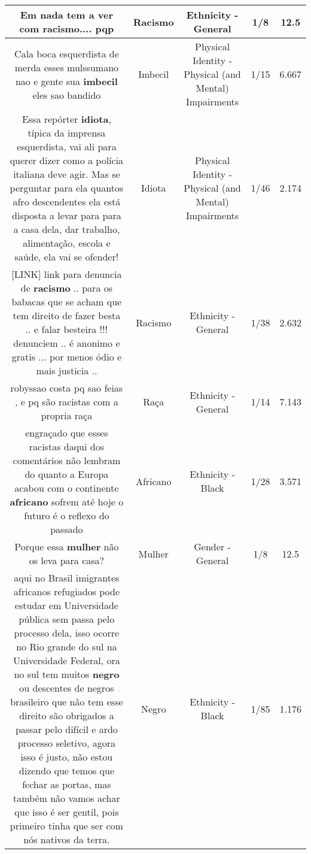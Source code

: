 \documentclass[11pt]{article}
\newlength\mylength
\begin{document}
\begin{center}
\begin{longtable}{|C{.65\mylength}|C{.30\mylength}|C{.12\mylength}|C{.12\mylength}|C{.12\mylength}|}
  \small Em nada tem a ver com \textbf{racismo}.... pqp\normalsize   & Racismo & Ethnicity - General & 1/8 & 12.5 \\  \hline
  \small Cala boca esquerdista de merda esses mulssumano nao e gente sua \textbf{imbecil} eles sao bandido\normalsize   & Imbecil & Physical Identity - Physical (and Mental) Impairments & 1/15 & 6.667 \\  \hline
  \small Essa repórter \textbf{idiota},  típica da imprensa esquerdista, vai ali para querer dizer como a polícia italiana deve agir. Mas se perguntar para ela quantos afro descendentes ela está disposta a levar para para a casa dela, dar trabalho, alimentação, escola e saúde, ela vai se ofender!\normalsize   & Idiota & Physical Identity - Physical (and Mental) Impairments & 1/46 & 2.174 \\  \hline
  \small  [LINK]     link para denuncia de \textbf{racismo} .. para os babacas que se acham que tem direito de fazer besta .. e falar besteira !!!  denunciem .. é anonimo e gratis ... por menos ódio e mais justicia ..\normalsize   & Racismo & Ethnicity - General & 1/38 & 2.632 \\  \hline
  \small robyssao costa pq sao feias , e pq são racistas com a propria raça\normalsize   & Raça & Ethnicity - General & 1/14 & 7.143 \\  \hline
  \small engraçado que esses racistas daqui dos comentários não lembram do quanto a Europa acabou com o continente \textbf{africano} sofrem até hoje o futuro é o reflexo do passado\normalsize   & Africano & Ethnicity - Black & 1/28 & 3.571 \\  \hline
  \small Porque essa \textbf{mulher} não os leva para casa?\normalsize   & Mulher & Gender - General & 1/8 & 12.5 \\  \hline
  \small aqui no Brasil imigrantes africanos refugiados pode estudar em Universidade pública sem passa pelo processo dela, isso ocorre no Rio grande do sul na Universidade Federal, ora no sul tem muitos \textbf{negro} ou descentes de negros brasileiro que não tem esse direito são obrigados a passar pelo difícil e ardo processo seletivo, agora isso é justo, não estou dizendo que temos que fechar as portas, mas também não vamos achar que isso é ser gentil, pois primeiro tinha que ser com nós nativos da terra.\normalsize   & Negro & Ethnicity - Black & 1/85 & 1.176 \\  \hline

\end{longtable}
\end{center}
\end{document}
